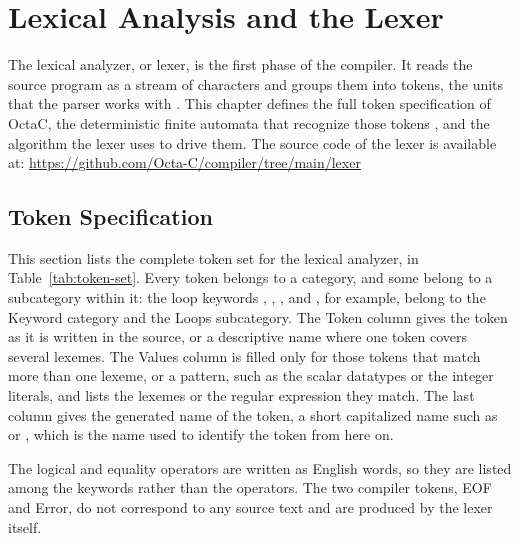 
\chapter{Lexical Analysis and the Lexer}
\label{chp:lexer}

The lexical analyzer, or lexer, is the first phase of the compiler. It reads
the source program as a stream of characters and groups them into tokens,
the units that the parser works with \cite{aho2006compilers}. This chapter
defines the full token specification of OctaC, the deterministic finite
automata that recognize those tokens
\cite{aho2006compilers,hopcroft2006automata}, and the algorithm the lexer
uses to drive them. The source code of the lexer is available at:
\url{https://github.com/Octa-C/compiler/tree/main/lexer}

\section{Token Specification}

This section lists the complete token set for the lexical analyzer, in
Table~\ref{tab:token-set}. Every token belongs to a category, and some
belong to a subcategory within it: the loop keywords , ,
, and , for example, belong to the Keyword
category and the Loops subcategory. The Token column gives the token as it
is written in the source, or a descriptive name where one token covers
several lexemes. The Values column is filled only for those tokens that
match more than one lexeme, or a pattern, such as the scalar datatypes or
the integer literals, and lists the lexemes or the regular expression they
match. The last column gives the generated name of the token, a short
capitalized name such as  or , which is the name
used to identify the token from here on.

The logical and equality operators are written as English words, so they are
listed among the keywords rather than the operators. The two compiler tokens,
EOF and Error, do not correspond to any source text and are produced by the
lexer itself.

